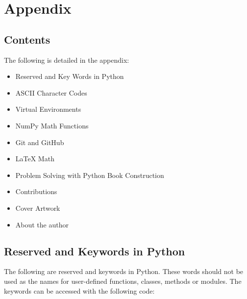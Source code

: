 \documentclass{book}
\begin{document}
    




    
        \chapter{Appendix}\label{appendix}
    




    
        \section{Contents}\label{contents}
    




    
        The following is detailed in the appendix:

\begin{itemize}
\item
  Reserved and Key Words in Python
\item
  ASCII Character Codes
\item
  Virtual Environments
\item
  NumPy Math Functions
\item
  Git and GitHub
\item
  LaTeX Math
\item
  Problem Solving with Python Book Construction
\item
  Contributions
\item
  Cover Artwork
\item
  About the author
\end{itemize}
        \newpage



    




    
        \section{Reserved and Keywords in
Python}\label{reserved-and-keywords-in-python}
    




    
        The following are reserved and keywords in Python. These words should
not be used as the names for user-defined functions, classes, methods or
modules. The keywords can be accessed with the following code:
    
\end{document}
